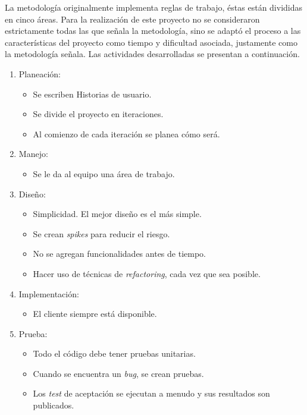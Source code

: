 La metodología originalmente implementa reglas de trabajo, éstas están divididas en cinco áreas. Para la realización de este proyecto no se consideraron estrictamente todas las que señala la metodología, sino se adaptó el proceso a las características del proyecto como tiempo y dificultad asociada, justamente como la metodología señala. Las actividades desarrolladas se presentan a continuación.

\begin{enumerate}
\item Planeación:
	\begin{itemize}
	\item Se escriben Historias de usuario. 
	\item Se divide el proyecto en iteraciones.
	\item Al comienzo de cada iteración se planea cómo será.
	\end{itemize}
\item Manejo:
	\begin{itemize}
	\item Se le da al equipo una área de trabajo.
	\end{itemize}
\item Diseño:
	\begin{itemize}
	\item Simplicidad. El mejor diseño es el más simple.
	\item Se crean \textit{spikes} para reducir el riesgo.
	\item No se agregan funcionalidades antes de tiempo.
	\item Hacer uso de técnicas de \textit{refactoring}, cada vez que sea posible.
	\end{itemize}
\item Implementación:
	\begin{itemize}
	\item El cliente siempre está disponible. 
	\end{itemize}
\item Prueba:
	\begin{itemize}
	\item Todo el código debe tener pruebas unitarias.
	\item Cuando se encuentra un \textit{bug}, se crean pruebas.
	\item Los \textit{test} de aceptación se ejecutan a menudo y sus resultados son publicados.
	\end{itemize}
\end{enumerate}

